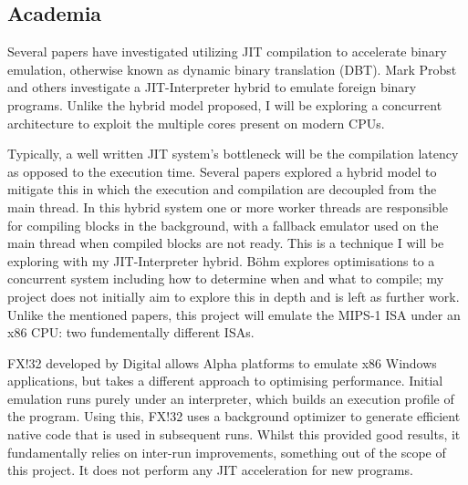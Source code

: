 \subsection{Academia}
\label{section:background-academia}

Several papers have investigated utilizing JIT compilation to accelerate binary emulation, otherwise known as dynamic binary translation (DBT). Mark Probst \cite{mark-probst-dbt} and others \cite{nigel-jit} investigate a JIT-Interpreter hybrid to emulate foreign binary programs. Unlike the hybrid model proposed, I will be exploring a concurrent architecture to exploit the multiple cores present on modern CPUs.

Typically, a well written JIT system's bottleneck will be the compilation latency as opposed to the execution time. Several papers \cite{js-concurrent-trace, dynamic-compilation-early} explored a hybrid model to mitigate this in which the execution and compilation are decoupled from the main thread. In this hybrid system one or more worker threads are responsible for compiling blocks in the background, with a fallback emulator used on the main thread when compiled blocks are not ready. This is a technique I will be exploring with my JIT-Interpreter hybrid. Böhm \cite{igor-phd} explores optimisations to a concurrent system including how to determine when and what to compile; my project does not initially aim to explore this in depth and is left as further work. Unlike the mentioned papers, this project will emulate the MIPS-1 ISA under an x86 CPU: two fundementally different ISAs.

FX!32 \cite{fx!32} developed by Digital allows Alpha platforms to emulate x86 Windows applications, but takes a different approach to optimising performance. Initial emulation runs purely under an interpreter, which builds an execution profile of the program. Using this, FX!32 uses a background optimizer to generate efficient native code that is used in subsequent runs. Whilst this provided good results, it fundamentally relies on inter-run improvements, something out of the scope of this project. It does not perform any JIT acceleration for new programs.